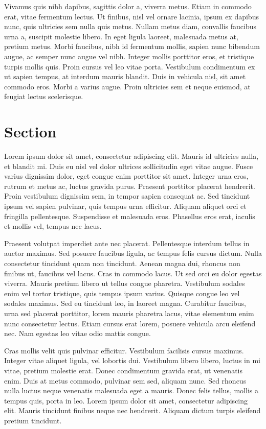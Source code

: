 \documentclass[a4paper,openright,twoside]{memoir}
\begin{document}
Vivamus quis nibh dapibus, sagittis dolor a, viverra metus. Etiam in commodo erat, vitae fermentum lectus. Ut finibus, nisl vel ornare lacinia, ipsum ex dapibus nunc, quis ultricies sem nulla quis metus. Nullam metus diam, convallis faucibus urna a, suscipit molestie libero. In eget ligula laoreet, malesuada metus at, pretium metus. Morbi faucibus, nibh id fermentum mollis, sapien nunc bibendum augue, ac semper nunc augue vel nibh. Integer mollis porttitor eros, et tristique turpis mollis quis. Proin cursus vel leo vitae porta. Vestibulum condimentum ex ut sapien tempus, at interdum mauris blandit. Duis in vehicula nisl, sit amet commodo eros. Morbi a varius augue. Proin ultricies sem et neque euismod, at feugiat lectus scelerisque.


\section{Section}
Lorem ipsum dolor sit amet, consectetur adipiscing elit. Mauris id ultricies nulla, et blandit mi. Duis eu nisl vel dolor ultrices sollicitudin eget vitae augue. Fusce varius dignissim dolor, eget congue enim porttitor sit amet. Integer urna eros, rutrum et metus ac, luctus gravida purus. Praesent porttitor placerat hendrerit. Proin vestibulum dignissim sem, in tempor sapien consequat ac. Sed tincidunt ipsum vel sapien pulvinar, quis tempus urna efficitur. Aliquam aliquet orci et fringilla pellentesque. Suspendisse et malesuada eros. Phasellus eros erat, iaculis et mollis vel, tempus nec lacus.

Praesent volutpat imperdiet ante nec placerat. Pellentesque interdum tellus in auctor maximus. Sed posuere faucibus ligula, ac tempus felis cursus dictum. Nulla consectetur tincidunt quam non tincidunt. Aenean magna dui, rhoncus non finibus ut, faucibus vel lacus. Cras in commodo lacus. Ut sed orci eu dolor egestas viverra. Mauris pretium libero ut tellus congue pharetra. Vestibulum sodales enim vel tortor tristique, quis tempus ipsum varius. Quisque congue leo vel sodales maximus. Sed eu tincidunt leo, in laoreet magna. Curabitur faucibus, urna sed placerat porttitor, lorem mauris pharetra lacus, vitae elementum enim nunc consectetur lectus. Etiam cursus erat lorem, posuere vehicula arcu eleifend nec. Nam egestas leo vitae odio mattis congue.

Cras mollis velit quis pulvinar efficitur. Vestibulum facilisis cursus maximus. Integer vitae aliquet ligula, vel lobortis dui. Vestibulum libero libero, luctus in mi vitae, pretium molestie erat. Donec condimentum gravida erat, ut venenatis enim. Duis at metus commodo, pulvinar sem sed, aliquam nunc. Sed rhoncus nulla luctus neque venenatis malesuada eget a mauris. Donec felis tellus, mollis a tempus quis, porta in leo. Lorem ipsum dolor sit amet, consectetur adipiscing elit. Mauris tincidunt finibus neque nec hendrerit. Aliquam dictum turpis eleifend pretium tincidunt.
\end{document}
